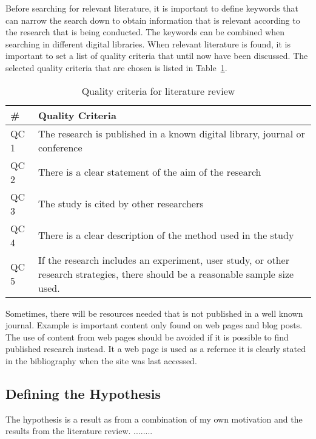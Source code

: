 	    Before searching for relevant literature, it is important to define keywords that can narrow the search down to obtain information that is relevant according to the research that is being conducted. The keywords can be combined when searching in different digital libraries. When relevant literature is found, it is important to set a list of quality criteria that until now have been discussed.
	    The selected quality criteria that are chosen is listed in Table~\ref{tab:QualityCriteria}.

	      \begin{table}[H]
	        \centering
	        \begin{tabular}{| l | p{10cm} |}
	          \hline
	          {\bf \#} & {\bf Quality Criteria} \\ \hline
	          QC 1 & The research is published in a known digital library, journal or conference\\ \hline
	          QC 2 & There is a clear statement of the aim of the research\\ \hline
	          QC 3 & The study is cited by other researchers\\ \hline
	          QC 4 & There is a clear description of the method used in the study\\ \hline
	          QC 5 & If the research includes an experiment, user study, or other research strategies, there should be a reasonable sample size used. \\ \hline
	        \end{tabular}
	        \caption{Quality criteria for literature review}
	        \label{tab:QualityCriteria}
	      \end{table}

	    Sometimes, there will be resources needed that is not published in a well known journal. Example is important content only found on web pages and blog posts. The use of content from web pages should be avoided if it is possible to find published research instead. It a web page is used as a refernce it is clearly stated in the bibliography when the site was last accessed. 

	 	\subsection{Defining the Hypothesis}

	 		The hypothesis is a result as from a combination of my own motivation and the results from the literature review. 
	 		........

